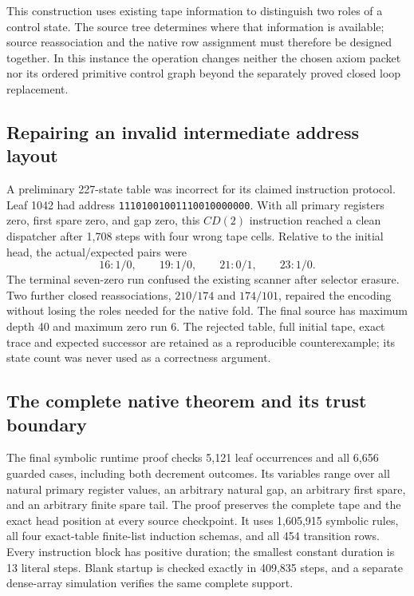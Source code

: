 This construction uses existing tape information to distinguish two roles of a
control state.  The source tree determines where that information is available;
source reassociation and the native row assignment must therefore be designed
together.  In this instance the operation changes neither the chosen axiom
packet nor its ordered primitive control graph beyond the separately proved
closed loop replacement.

\subsection{Repairing an invalid intermediate address layout}

A preliminary 227-state table was incorrect for its claimed instruction
protocol.  Leaf 1042 had address
\texttt{11101001001110010000000}.  With all primary registers zero, first spare
zero, and gap zero, this $CD(2)$ instruction reached a clean dispatcher after
1,708 steps with four wrong tape cells.  Relative to the initial head, the
actual/expected pairs were
\[
16:1/0,\qquad19:1/0,\qquad21:0/1,\qquad23:1/0.
\]
The terminal seven-zero run confused the existing scanner after selector
erasure.  Two further closed reassociations, $210/174$ and $174/101$, repaired
the encoding without losing the roles needed for the native fold.  The final
source has maximum depth 40 and maximum zero run 6.  The rejected table, full
initial tape, exact trace and expected successor are retained as a reproducible
counterexample; its state count was never used as a correctness argument.

\subsection{The complete native theorem and its trust boundary}

The final symbolic runtime proof checks 5,121 leaf occurrences and all 6,656
guarded cases, including both decrement outcomes.  Its variables range over all
natural primary register values, an arbitrary natural gap, an arbitrary first
spare, and an arbitrary finite spare tail.  The proof preserves the complete
tape and the exact head position at every source checkpoint.  It uses
1,605,915 symbolic rules, all four exact-table finite-list induction schemas,
and all 454 transition rows.  Every instruction block has positive duration;
the smallest constant duration is 13 literal steps.  Blank startup is checked
exactly in 409,835 steps, and a separate dense-array simulation verifies the
same complete support.

